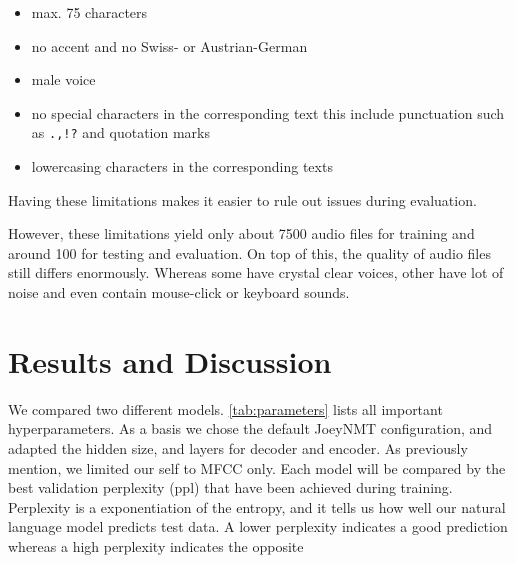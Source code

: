 \documentclass[11pt,a4paper]{article}
\begin{document}
\begin{itemize}
    \item max. 75 characters
    \item no accent and no Swiss- or Austrian-German
    \item male voice
    \item no special characters in the corresponding text\newline 
          this include punctuation such as \texttt{.,!?} and quotation marks
    \item lowercasing characters in the corresponding texts
\end{itemize}

Having these limitations makes it easier to rule out issues during evaluation.

However, these limitations yield only about 7500 audio files for training and around 100 for testing and evaluation.  On top of this, the quality of audio files still differs enormously.  Whereas some have crystal clear voices, other have lot of noise and even contain mouse-click or keyboard sounds.


\section{Results and Discussion}

We compared two different models. \autoref{tab:parameters} lists all important hyperparameters. As a basis we chose the default JoeyNMT configuration, and adapted the hidden size, and layers for decoder and encoder. As previously mention, we limited our self to MFCC only. Each model will be compared by the best validation perplexity (ppl) that have been achieved during training. Perplexity is a exponentiation of the entropy, and it tells us how well our natural language model predicts test data. A lower perplexity indicates a good prediction whereas a high perplexity indicates the opposite \cite{jozefowicz2016exploring}
\end{document}
